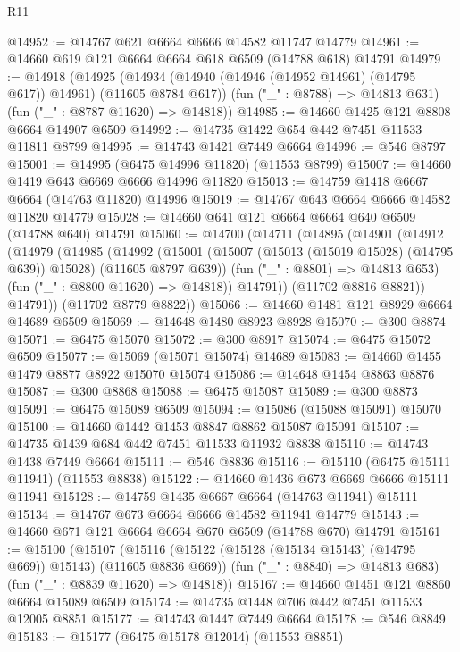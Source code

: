 \begin{lexlean}{R11}
\begin{coremodule}
{{{{{{{{{{{{{{{{{{{{{{{{{{{{{{{{{{{{{{{{{{{{{{{{{{{{{{{{{{{{{{{{{{{{{{{{{{{{{{{{{{@14952 := @14767 @621 @6664 @6666 @14582 @11747 @14779
@14961 := @14660 @619 @121 @6664 @6664 @618 @6509 (@14788 @618) @14791
@14979 := @14918
    (@14925
      (@14934 (@14940 (@14946 (@14952 @14961) (@14795 @617)) @14961) (@11605 @8784 @617))
      (fun ("_" : @8788) => @14813 @631)
      (fun ("_" : @8787 @11620) => @14818))
@14985 := @14660 @1425 @121 @8808 @6664 @14907 @6509
@14992 := @14735 @1422 @654 @442 @7451 @11533 @11811 @8799
@14995 := @14743 @1421 @7449 @6664
@14996 := @546 @8797
@15001 := @14995 (@6475 @14996 @11820) (@11553 @8799)
@15007 := @14660 @1419 @643 @6669 @6666 @14996 @11820
@15013 := @14759 @1418 @6667 @6664 (@14763 @11820) @14996
@15019 := @14767 @643 @6664 @6666 @14582 @11820 @14779
@15028 := @14660 @641 @121 @6664 @6664 @640 @6509 (@14788 @640) @14791
@15060 := @14700
    (@14711
      (@14895
        (@14901
          (@14912
            (@14979
              (@14985
                (@14992
                  (@15001
                    (@15007 (@15013 (@15019 @15028) (@14795 @639)) @15028)
                    (@11605 @8797 @639))
                  (fun ("_" : @8801) => @14813 @653)
                  (fun ("_" : @8800 @11620) => @14818))
                @14791))
            (@11702 @8816 @8821))
          @14791))
      (@11702 @8779 @8822))
@15066 := @14660 @1481 @121 @8929 @6664 @14689 @6509
@15069 := @14648 @1480 @8923 @8928
@15070 := @300 @8874
@15071 := @6475 @15070
@15072 := @300 @8917
@15074 := @6475 @15072 @6509
@15077 := @15069 (@15071 @15074) @14689
@15083 := @14660 @1455 @1479 @8877 @8922 @15070 @15074
@15086 := @14648 @1454 @8863 @8876
@15087 := @300 @8868
@15088 := @6475 @15087
@15089 := @300 @8873
@15091 := @6475 @15089 @6509
@15094 := @15086 (@15088 @15091) @15070
@15100 := @14660 @1442 @1453 @8847 @8862 @15087 @15091
@15107 := @14735 @1439 @684 @442 @7451 @11533 @11932 @8838
@15110 := @14743 @1438 @7449 @6664
@15111 := @546 @8836
@15116 := @15110 (@6475 @15111 @11941) (@11553 @8838)
@15122 := @14660 @1436 @673 @6669 @6666 @15111 @11941
@15128 := @14759 @1435 @6667 @6664 (@14763 @11941) @15111
@15134 := @14767 @673 @6664 @6666 @14582 @11941 @14779
@15143 := @14660 @671 @121 @6664 @6664 @670 @6509 (@14788 @670) @14791
@15161 := @15100
    (@15107
      (@15116 (@15122 (@15128 (@15134 @15143) (@14795 @669)) @15143) (@11605 @8836 @669))
      (fun ("_" : @8840) => @14813 @683)
      (fun ("_" : @8839 @11620) => @14818))
@15167 := @14660 @1451 @121 @8860 @6664 @15089 @6509
@15174 := @14735 @1448 @706 @442 @7451 @11533 @12005 @8851
@15177 := @14743 @1447 @7449 @6664
@15178 := @546 @8849
@15183 := @15177 (@6475 @15178 @12014) (@11553 @8851)
}}}}}}}}}}}}}}}}}}}}}}}}}}}}}}}}}}}}}}}}}}}}}}}}}}}}}}}}}}}}}}}}}}}}}}}}}}}}}}}}}}
\end{coremodule}
\end{lexlean}
